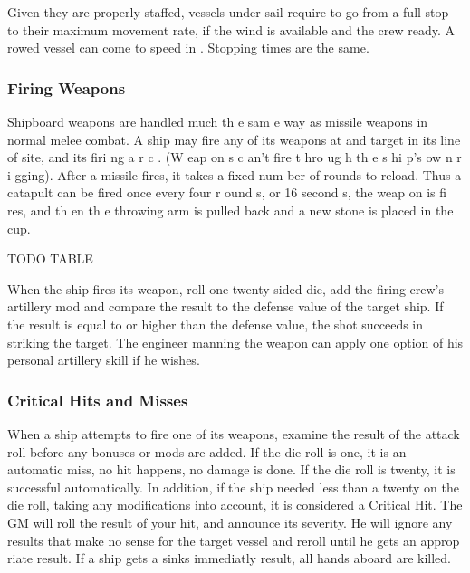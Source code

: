 \begin{multicols*}{2}
Given they are properly staffed, vessels under sail require  to go from a full stop to their maximum movement rate, if the wind is available and the crew ready. A
rowed vessel can come to speed in . Stopping times are the same. 
\subsubsection{Firing Weapons}
Shipboard weapons are handled much th e sam e
way as missile weapons in normal melee combat. A ship may
fire any of its weapons at and target in its line of site, and its
firi ng a r c . (W eap on s c an’t fire t hro ug h th e s hi p’s ow n
r i gging). After a missile fires, it takes a fixed num ber of
rounds to reload. Thus a catapult can be fired once every four
r ound s, or 16 second s, the weap on is fi res, and th en th e
throwing arm is pulled back and a new stone is placed in the
cup.

TODO TABLE 

When the ship fires its weapon, roll one twenty
sided die, add the firing crew’s artillery mod and compare the
result to the defense value of the target ship. If the result is
equal to or higher than the defense value, the shot succeeds in
striking the target. The engineer manning the weapon can
apply one option of his personal artillery skill if he wishes.
\subsubsection{Critical Hits and Misses}
When a ship attempts to fire one of its weapons,
examine the result of the attack roll before any bonuses or
mods are added. If the die roll is one, it is an automatic miss,
no hit happens, no damage is done. If the die roll is twenty, it
is successful automatically. In addition, if the ship needed less
than a twenty on the die roll, taking any modifications into
account, it is considered a Critical Hit. The GM will roll the
result of your hit, and announce its severity. He will ignore
any results that make no sense for the target vessel and reroll
until he gets an approp riate result. If a ship gets a sinks
immediatly result, all hands aboard are killed.

\end{multicols*}
